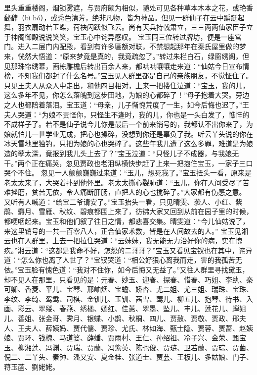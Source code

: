 \documentclass[12pt,oneside]{book}
\begin{document}
里头重重楼阁，烟锁雾遮，与贾府颇为相似，随处可见各种草本木本之花，或艳香馝馞（bì bó），或秀色清芳，绝非凡物，皆为神品。但见一群仙子在云中蹁跹起舞，羽衣扇动若玉蝶，荷袂闪跃似飞云。尚有天兵持戟肃立，三三两两仙家臣子立于神阁御殿说说笑笑，宝玉心中诧异感叹。
宝玉同三位转过牌坊，便是一座宫门。进入二层门内配殿，看到有许多匾额对联，不禁想起那年在秦氏屋里做的梦来，恍然大悟道：“原来梦竟是真的，我竟疏忽了。”转过朱栏白石，绿窗绣阁，但见那珠帘绣幕，画栋雕檐后转出百余人来，都哄哄嚷嚷走来道：“仙姑今日宣布情榜，不知我们都封了什么名号。”宝玉见人群里都是自己的亲族朋友，不觉怔住了。
只见王夫人从众人中走出，和他四目相对，上来一把搂住泣道：“宝玉，我的儿，这么多年不见，你怎么落魄到这步田地，为娘的心都碎了！”母子抱着大哭。旁边之人也都陪着落泪。宝玉道：“母亲，儿子惭愧荒度了一生，如今后悔也迟了。”王夫人哭道：“为娘不责怪你，只怪生不逢时，我的儿，你也是一头白发了，憔悴的不成样子了。若不是仙子说今儿你是最后一个前来销号的，我都认不出你来了，为娘就怕儿一世学业无成，把心也操碎，没想到你还是辜负了我。听云丫头说的你在冰天雪地里独钓，只把为娘的心也哭碎了。这些年我儿遭了这么多罪，难道是为娘造的孽太深，竟报到我儿头上去了？”宝玉泣道：“只怪儿子不成器，与我娘无干。”两个正在痛哭，忽见贾政也老泪纵横快步赶了上来一把抱住宝玉，一家子三口哭个不住。
忽见一人颤颤巍巍过来道：“玉儿，想死我了。”宝玉扭头一看，原来是老太太来了，大哭着扑到他怀里。老太太撕心裂肺道：“玉儿，你在人间受尽了苦难挫磨，贫苦无依，令人痛断肝肠，直把人的心也搅碎了。”大家都有伤感之意。
又听有人喊道：“给宝二爷请安了。”宝玉抬头一看，只见晴雯、袭人、小红、紫鹃、麝月、雪雁、秋纹、碧痕都围上来了，彷彿大家又回到从前在园子里的时候，都哽咽起来。宝玉和他们叙了往日之情，都悲喜交集。晴雯道：“今儿仙姑说了，来这里销号的一共一百零八人，正合仙家术数，皆是在人间故去的人。”
宝玉见湘云也在人群里，上去一把拉住哭道：“云妹妹，我无能无力治好你的病，实在愧疚。”湘云道：“这都是我命不好，怎怨的二哥哥？”宝玉又看见宝钗也在其中，诧异道：“怎么你也离了人世了？”宝钗哭道：“相公好狠心离我而走，害的我孤苦无依。”宝玉脸有愧色道：“我对不住你，如今后悔又无益了。”又往人群里寻找黛玉，却不见人在那里，只看见的是：元春、妙玉、迎春、探春、惜春、巧姐、李纨、秦可卿、香菱、平儿、宝琴、邢岫烟、宝蟾、娇杏、尤二姐、尤三姐、瑞珠、宝珠、李纹、李绮、鸳鸯、司棋、金钏儿、玉钏、茜雪、莺儿、柳五儿、抱琴、待书、入画、彩云、翠缕、春燕、绣橘、嫣红、佳蕙、翠墨、坠儿、丰儿、莲花儿、蝉姐儿、善姐、张金哥、霁月、银蝶、小鹊、秋桐、四儿、贾赦、贾敬、贾政、邢夫人、王夫人、薛姨妈、贾代儒、贾珍、尤氏、林如海、甄士隐、贾蓉、贾蔷、赵姨娘、贾环、钱槐、马道婆、薛蟠、贾雨村、王仁、孙绍祖、冷子兴、金荣、甄宝玉、柳湘莲、冯渊、贾瑞、贾蘭、冯紫英、陈也俊、贾琏、卫若蘭、贾琮、贾菌、倪二、二丫头、秦钟、潘又安、夏金桂、张道士、贾芸、王板儿、多姑娘、门子、蒋玉菡、劉姥姥。
\end{document}
